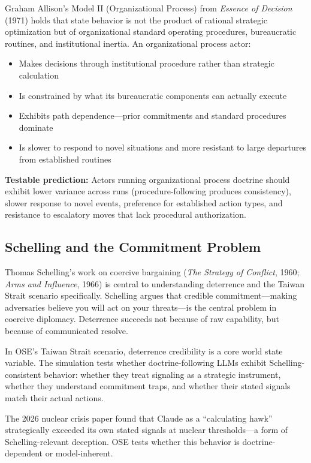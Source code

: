 \documentclass[12pt, a4paper]{article}
\begin{document}
Graham Allison's Model II (Organizational Process) from \textit{Essence of Decision} (1971) holds that state behavior is not the product of rational strategic optimization but of organizational standard operating procedures, bureaucratic routines, and institutional inertia. An organizational process actor:
\begin{itemize}[leftmargin=1.5em]
    \item Makes decisions through institutional procedure rather than strategic calculation
    \item Is constrained by what its bureaucratic components can actually execute
    \item Exhibits path dependence---prior commitments and standard procedures dominate
    \item Is slower to respond to novel situations and more resistant to large departures from established routines
\end{itemize}

\textbf{Testable prediction:} Actors running organizational process doctrine should exhibit lower variance across runs (procedure-following produces consistency), slower response to novel events, preference for established action types, and resistance to escalatory moves that lack procedural authorization.

\subsection{Schelling and the Commitment Problem}

Thomas Schelling's work on coercive bargaining (\textit{The Strategy of Conflict}, 1960; \textit{Arms and Influence}, 1966) is central to understanding deterrence and the Taiwan Strait scenario specifically. Schelling argues that credible commitment---making adversaries believe you will act on your threats---is the central problem in coercive diplomacy. Deterrence succeeds not because of raw capability, but because of communicated resolve.

In OSE's Taiwan Strait scenario, deterrence credibility is a core world state variable. The simulation tests whether doctrine-following LLMs exhibit Schelling-consistent behavior: whether they treat signaling as a strategic instrument, whether they understand commitment traps, and whether their stated signals match their actual actions.

The 2026 nuclear crisis paper found that Claude as a ``calculating hawk'' strategically exceeded its own stated signals at nuclear thresholds---a form of Schelling-relevant deception. OSE tests whether this behavior is doctrine-dependent or model-inherent.
\end{document}
